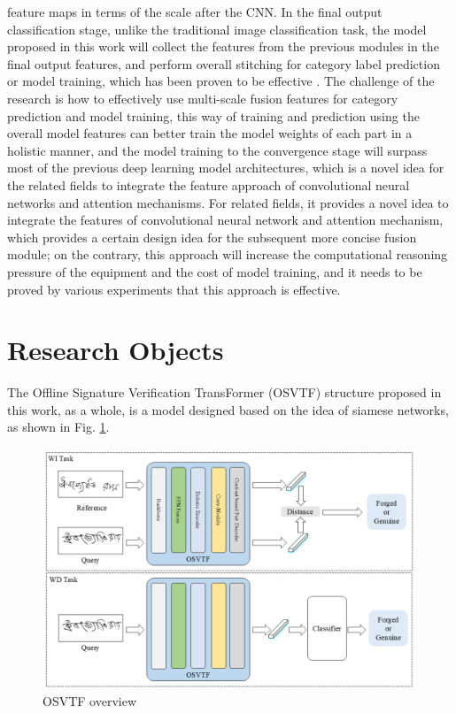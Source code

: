 feature maps in terms of the scale after the CNN. In the final output classification stage, unlike the traditional image classification task, the model proposed in this work will collect the features from the previous modules in the final output features, and perform overall stitching for category label prediction or model training, which has been proven to be effective \cite{41}. The challenge of the research is how to effectively use multi-scale fusion features for category prediction and model training, this way of training and prediction using the overall model features can better train the model weights of each part in a holistic manner, and the model training to the convergence stage will surpass most of the previous deep learning model architectures, which is a novel idea for the related fields to integrate the feature approach of convolutional neural networks and attention mechanisms. For related fields, it provides a novel idea to integrate the features of convolutional neural network and attention mechanism, which provides a certain design idea for the subsequent more concise fusion module; on the contrary, this approach will increase the computational reasoning pressure of the equipment and the cost of model training, and it needs to be proved by various experiments that this approach is effective.

\section{Research Objects}

The Offline Signature Verification TransFormer (OSVTF) structure proposed in this work, as a whole, is a model designed based on the idea of siamese networks, as shown in Fig. \ref{fig:overview}.

\begin{figure}[htbp]
    \begin{center}
        \includegraphics[scale=0.5]{figure/overview.png}
    \end{center}
    \caption{OSVTF overview}
    \label{fig:overview}
\end{figure}

